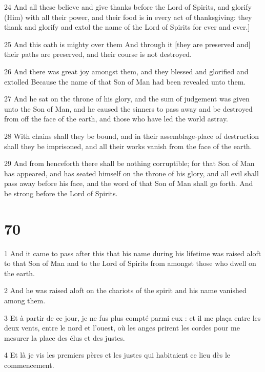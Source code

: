 \par 24 And all these believe and give thanks before the Lord of Spirits, and glorify (Him) with all their power, and their food is in every act of thanksgiving: they thank and glorify and extol the name of the Lord of Spirits for ever and ever.]
\par 25 And this oath is mighty over them And through it [they are preserved and] their paths are preserved, and their course is not destroyed.
\par 26 And there was great joy amongst them, and they blessed and glorified and extolled Because the name of that Son of Man had been revealed unto them.
\par 27 And he sat on the throne of his glory, and the sum of judgement was given unto the Son of Man, and he caused the sinners to pass away and be destroyed from off the face of the earth, and those who have led the world astray.
\par 28 With chains shall they be bound, and in their assemblage-place of destruction shall they be imprisoned, and all their works vanish from the face of the earth.
\par 29 And from henceforth there shall be nothing corruptible; for that Son of Man has appeared, and has seated himself on the throne of his glory, and all evil shall pass away before his face, and the word of that Son of Man shall go forth. And be strong before the Lord of Spirits.

\chapter{70}

\par 1 And it came to pass after this that his name during his lifetime was raised aloft to that Son of Man and to the Lord of Spirits from amongst those who dwell on the earth.
\par 2 And he was raised aloft on the chariots of the spirit and his name vanished among them.
\par 3 Et à partir de ce jour, je ne fus plus compté parmi eux : et il me plaça entre les deux vents, entre le nord et l'ouest, où les anges prirent les cordes pour me mesurer la place des élus et des justes.
\par 4 Et là je vis les premiers pères et les justes qui habitaient ce lieu dès le commencement.


